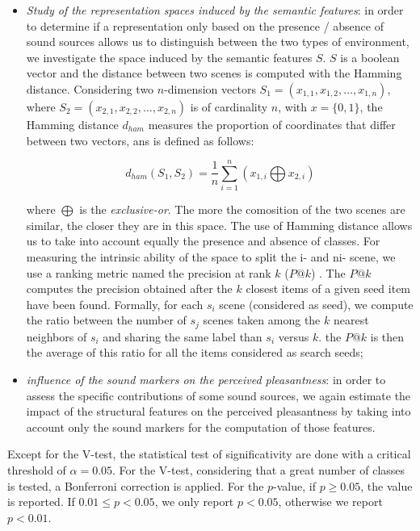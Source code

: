 \documentclass[twoside,twocolumn]{article}
\begin{document}
\begin{itemize}
\item \emph{Study of the representation spaces induced by the semantic features}: in order to determine if a representation only based on the presence / absence of sound sources allows us to distinguish between the two types of environment, we investigate the space induced by the semantic features $S$. $S$ is a boolean vector and the distance between two scenes is computed with the Hamming distance. Considering two $n$-dimension vectors $S_1=(x_{1,1},x_{1,2},\ldots,x_{1,n})$, where $S_2=(x_{2,1},x_{2,2},\ldots,x_{2,n})$ is of cardinality $n$, with $x=\lbrace 0,1\rbrace$, the Hamming distance $d_{ham}$ measures the proportion of coordinates that differ between two vectors, ans is defined as follows:

\begin{equation*}
d_{ham}(S_1,S_2)=\dfrac{1}{n}\sum_{i=1}^{n} (x_{1,i} \bigoplus x_{2,i})
\end{equation*}

where $\bigoplus$ is the \emph{exclusive-or}. The more the comosition of the two scenes are similar, the closer they are in this space. The use of Hamming distance allows us to take into account equally the presence and absence of classes. For measuring the intrinsic ability of the space to split the i- and ni- scene, we use a ranking metric named the precision at rank $k$ ($P@k$) . The $P@k$ computes the precision obtained after the $k$ closest items of a given seed item have been found. Formally, for each $s_i$ scene (considered as seed), we compute the ratio between the number of $s_j$ scenes taken among the $k$ nearest neighbors of $s_i$ and sharing the same label than $s_i$ versus $k$. the $P@k$ is then the average of this ratio for all the items considered as search seeds;

\item \emph{influence of the sound markers on the perceived pleasantness}: in order to assess the specific contributions of some sound sources, we again estimate the impact of the structural features on the perceived pleasantness by taking into account only the sound markers for the computation of those features.
\end{itemize}

Except for the V-test, the statistical test of significativity are done with a critical threshold of $\alpha=0.05$. For the V-test, considering that a great number of classes is tested, a Bonferroni correction is applied. For the $p$-value, if $p\geq0.05$, the value is reported. If $0.01\leq p<0.05$, we only report $p<0.05$, otherwise we report $p<0.01$.
\end{document}
